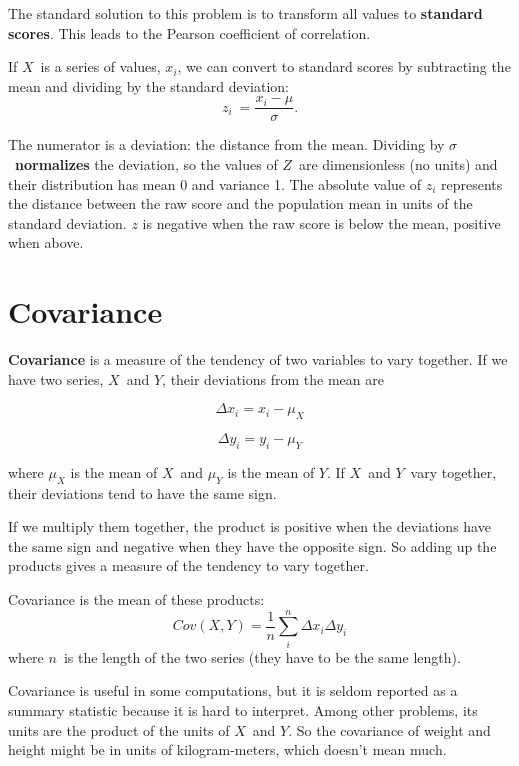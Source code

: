 The standard solution to this problem is to transform all values to \textbf{standard scores}.  This leads to
the Pearson coefficient of correlation.




If $X$~is a series of values, $x_i$, we can convert to standard
scores by subtracting the mean and dividing by the standard deviation:
\[ z_{i}~=\frac{x_{i}-\mu}{\sigma}. \]

The numerator is a deviation: the distance from the mean.  Dividing by
$\sigma$~\textbf{normalizes} the deviation, so the values of $Z$~are
dimensionless (no units) and their distribution has mean 0 and
variance 1.
The absolute value of $z_i$ represents the distance between the raw score and the population mean in units of the standard deviation.
$z$ is negative when the raw score is below the mean, positive when above.


\section{Covariance}

\textbf{Covariance} is a measure of the tendency of two variables
to vary together.  If we have two series, $X$~and $Y$, their
deviations from the mean are

\[ \Delta x_{i} = x_i-\mu_X \]

\[ \Delta y_{i} = y_i-\mu_Y \]

where $\mu_{X}$ is the mean of $X$~and $\mu_{Y}$ is the mean of $Y$.
If $X$~and $Y$~vary together, their deviations tend to have the same
sign.

If we multiply them together, the product is positive when the
deviations have the same sign and negative when they have the opposite
sign.  So adding up the products gives a measure of the tendency to
vary together.

Covariance is the mean of these products:
%
\[ Cov(X,Y) = \frac{1}{n} \sum_{i}^{n} \Delta x_i  \Delta y_i \]
%
where $n$~is the length of the two series (they have to be the same
length).

Covariance is useful in some computations, but
it is seldom reported as a summary statistic because it is hard to
interpret.  Among other problems, its units are the product of the
units of $X$~and $Y$.  So the covariance of weight and height might be
in units of kilogram-meters, which doesn't mean much.


